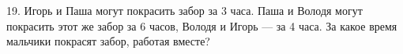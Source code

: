 19. Игорь и Паша могут покрасить забор за 3 часа. Паша и Володя могут покрасить этот же забор за 6 часов, Володя и Игорь --- за 4 часа. За какое время мальчики покрасят забор, работая вместе?\\
